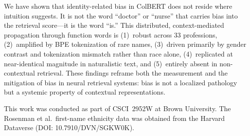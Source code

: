 \documentclass[sigconf,review,anonymous]{acmart}
\begin{document}
We have shown that identity-related bias in ColBERT does not reside where intuition suggests. It is not the word ``doctor'' or ``nurse'' that carries bias into the retrieval score---it is the word ``is.'' This distributed, context-mediated propagation through function words is (1)~robust across 33 professions, (2)~amplified by BPE tokenization of rare names, (3)~driven primarily by gender contrast and tokenization mismatch rather than race alone, (4)~replicated at near-identical magnitude in naturalistic text, and (5)~entirely absent in non-contextual retrieval. These findings reframe both the measurement and the mitigation of bias in neural retrieval systems: bias is not a localized pathology but a systemic property of contextual representations.


\begin{acks}
This work was conducted as part of CSCI~2952W at Brown University. The Rosenman et al.\ first-name ethnicity data was obtained from the Harvard Dataverse (DOI: 10.7910/DVN/SGKW0K).
\end{acks}




\end{document}
